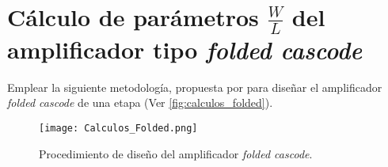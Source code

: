 \section{Cálculo de parámetros $\frac{W}{L}$ del amplificador tipo \textit{folded cascode} \label{sec:s3}}

\begin{center}
	\begin{minipage}{12cm}
		\begin{tcolorbox}[title=Actividad 2]
			Emplear la siguiente metodología, propuesta por \cite{Allen_2012} para diseñar el amplificador \textit{folded cascode} de una etapa (Ver \autoref{fig:calculos_folded}).
		\end{tcolorbox}	
	\end{minipage}
\end{center}

\begin{figure}[H]
	\centering
	\texttt{[image: Calculos\_Folded.png]}
	\caption{Procedimiento de diseño del amplificador \textit{folded cascode}. \label{fig:calculos_folded}}
\end{figure}

